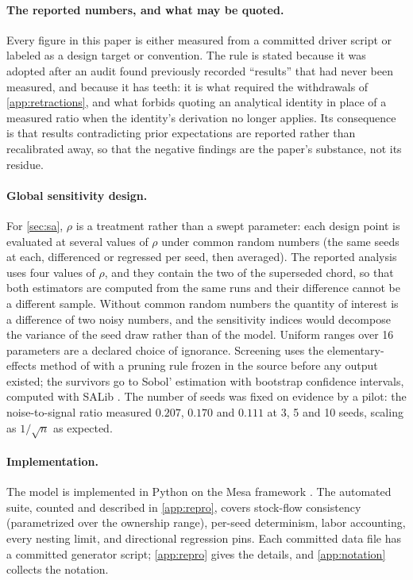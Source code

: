 \paragraph{The reported numbers, and what may be quoted.}
Every figure in this paper is either measured from a committed driver script or
labeled as a design target or convention. The rule is stated because it was
adopted after an audit found previously recorded ``results'' that had never
been measured, and because it has teeth: it is what required the withdrawals of
\cref{app:retractions}, and what forbids quoting an analytical identity in
place of a measured ratio when the identity's derivation no longer applies. Its
consequence is that results contradicting prior expectations are reported rather
than recalibrated away, so that the negative findings are the paper's substance,
not its residue.

\paragraph{Global sensitivity design.}
For \cref{sec:sa}, $\rho$ is a treatment rather than a swept parameter:
each design point is evaluated at several values of $\rho$ under common random
numbers (the same seeds at each, differenced or regressed per seed, then
averaged). The reported analysis uses four values of $\rho$, and they contain
the two of the superseded chord, so that both estimators are computed from the
same runs and their difference cannot be a different sample. Without
common random numbers the quantity of interest is a difference of two noisy
numbers, and the sensitivity indices would decompose the variance of the seed
draw rather than of the model. Uniform ranges over 16 parameters are a
declared choice of ignorance. Screening uses the elementary-effects
method of \citet{Morris1991} with a pruning rule frozen in the source before
any output existed; the survivors go to Sobol' estimation
\citep{Sobol2001,Saltelli2010} with bootstrap confidence intervals, computed
with SALib \citep{HermanUsher2017}. The number of seeds was fixed on evidence
by a pilot: the noise-to-signal ratio measured $0.207$, $0.170$ and $0.111$ at
3, 5 and 10 seeds, scaling as $1/\sqrt{n}$ as expected.

\paragraph{Implementation.}
The model is implemented in Python on the Mesa framework
\citep{Kazil2020}. The automated suite, counted and described in
\cref{app:repro}, covers stock-flow consistency (parametrized over the
ownership range), per-seed determinism, labor accounting, every nesting
limit, and directional regression pins. Each
committed data file has a committed generator script;
\cref{app:repro} gives the details, and \cref{app:notation} collects the
notation.

